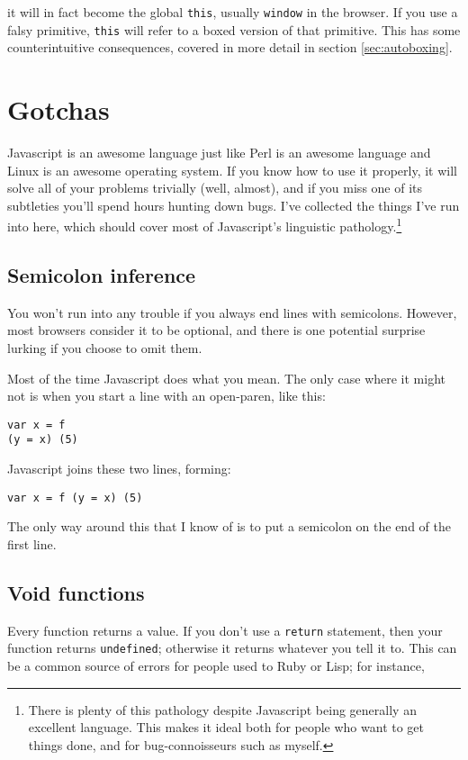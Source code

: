 \documentclass{article}
\begin{document}
      \noindent it will in fact become the global {\tt this}, usually {\tt window} in the browser. If you use a falsy primitive, {\tt this} will refer to a boxed version of that primitive.
      This has some counterintuitive consequences, covered in more detail in section \ref{sec:autoboxing}.

\section {Gotchas}
  Javascript is an awesome language just like Perl is an awesome language and Linux is an awesome operating system. If you know how to use it properly, it will solve all of your problems
  trivially (well, almost), and if you miss one of its subtleties you'll spend hours hunting down bugs. I've collected the things I've run into here, which should cover most of Javascript's
  linguistic pathology.\footnote{There is plenty of this pathology despite Javascript being generally an excellent language. This makes it ideal both for people who want to get things done,
  and for bug-connoisseurs such as myself.}

\subsection {Semicolon inference}
    You won't run into any trouble if you always end lines with semicolons. However, most browsers consider it to be optional, and there is one potential surprise lurking if you choose to omit
    them.

    Most of the time Javascript does what you mean. The only case where it might not is when you start a line with an open-paren, like this:

\begin{verbatim}
var x = f
(y = x) (5)
\end{verbatim}

    Javascript joins these two lines, forming:

\begin{verbatim}
var x = f (y = x) (5)
\end{verbatim}

    The only way around this that I know of is to put a semicolon on the end of the first line.

\subsection {Void functions}
    Every function returns a value. If you don't use a \verb|return| statement, then your function returns \verb|undefined|; otherwise it returns whatever you tell it to. This can be a common
    source of errors for people used to Ruby or Lisp; for instance,
\end{document}
